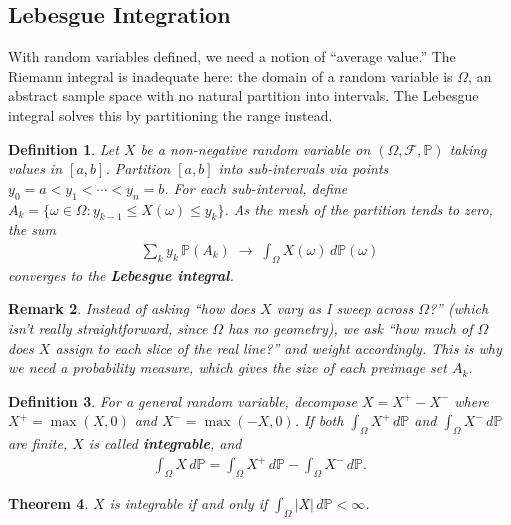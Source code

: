 \documentclass{report}
\theoremstyle{spacedplain}
\newtheorem{theorem}{Theorem}[section]
\theoremstyle{spaceddefinition}
\newtheorem{definition}[theorem]{Definition}
\theoremstyle{spacedremark}
\newtheorem{remark}[theorem]{Remark}
\begin{document}
\subsection{Lebesgue Integration}

With random variables defined, we need a notion of ``average value.'' The Riemann integral is inadequate here: the domain of a random variable is $\Omega$, an abstract sample space with no natural partition into intervals. The Lebesgue integral solves this by partitioning the range instead.

\begin{definition}
Let $X$ be a non-negative random variable on $(\Omega, \mathcal{F}, \mathbb{P})$ taking values in $[a,b]$. Partition $[a,b]$ into sub-intervals via points $y_0 = a < y_1 < \cdots < y_n = b$. For each sub-interval, define $A_k = \{\omega \in \Omega : y_{k-1} \leq X(\omega) \leq y_k\}$. As the mesh of the partition tends to zero, the sum
\begin{align}
    \sum_k y_k\, \mathbb{P}(A_k) \;\longrightarrow\; \int_\Omega X(\omega)\, d\mathbb{P}(\omega)
\end{align}
converges to the \textbf{Lebesgue integral}.
\end{definition}

\begin{remark}
Instead of asking ``how does $X$ vary as I sweep across $\Omega$?'' (which isn't really straightforward, since $\Omega$ has no geometry), we ask ``how much of $\Omega$ does $X$ assign to each slice of the real line?'' and weight accordingly. This is why we need a probability measure, which gives the size of each preimage set $A_k$.
\end{remark}

\begin{definition}
For a general random variable, decompose $X = X^+ - X^-$ where $X^+ = \max(X,0)$ and $X^- = \max(-X,0)$. If both $\int_\Omega X^+ \, d\mathbb{P}$ and $\int_\Omega X^- \, d\mathbb{P}$ are finite, $X$ is called \textbf{integrable}, and
\begin{align}
    \int_\Omega X\, d\mathbb{P} = \int_\Omega X^+\, d\mathbb{P} - \int_\Omega X^-\, d\mathbb{P}.
\end{align}
\end{definition}

\begin{theorem}
$X$ is integrable if and only if $\int_\Omega |X|\, d\mathbb{P} < \infty$.
\end{theorem}
\end{document}
